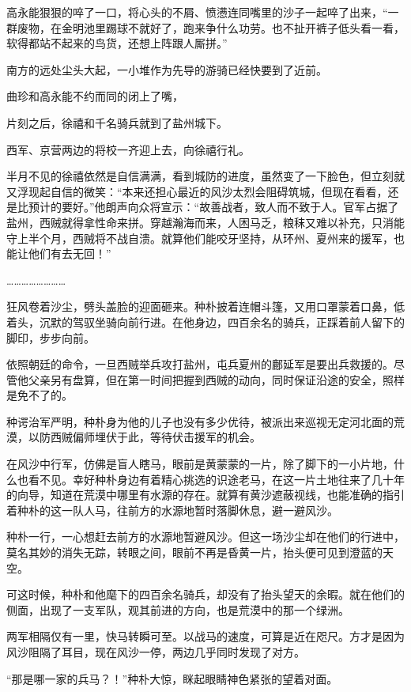高永能狠狠的啐了一口，将心头的不屑、愤懑连同嘴里的沙子一起啐了出来，“一群废物，在金明池里踢球不就好了，跑来争什么功劳。也不扯开裤子低头看一看，软得都站不起来的鸟货，还想上阵跟人厮拼。”

南方的远处尘头大起，一小堆作为先导的游骑已经快要到了近前。

曲珍和高永能不约而同的闭上了嘴，

片刻之后，徐禧和千名骑兵就到了盐州城下。

西军、京营两边的将校一齐迎上去，向徐禧行礼。

半月不见的徐禧依然是自信满满，看到城防的进度，虽然变了一下脸色，但立刻就又浮现起自信的微笑：“本来还担心最近的风沙太烈会阻碍筑城，但现在看看，还是比预计的要好。”他朗声向众将宣示：“故善战者，致人而不致于人。官军占据了盐州，西贼就得拿性命来拼。穿越瀚海而来，人困马乏，粮秣又难以补充，只消能守上半个月，西贼将不战自溃。就算他们能咬牙坚持，从环州、夏州来的援军，也能让他们有去无回！”

……………………

狂风卷着沙尘，劈头盖脸的迎面砸来。种朴披着连帽斗篷，又用口罩蒙着口鼻，低着头，沉默的驾驭坐骑向前行进。在他身边，四百余名的骑兵，正踩着前人留下的脚印，步步向前。

依照朝廷的命令，一旦西贼举兵攻打盐州，屯兵夏州的鄜延军是要出兵救援的。尽管他父亲另有盘算，但在第一时间把握到西贼的动向，同时保证沿途的安全，照样是免不了的。

种谔治军严明，种朴身为他的儿子也没有多少优待，被派出来巡视无定河北面的荒漠，以防西贼偏师埋伏于此，等待伏击援军的机会。

在风沙中行军，仿佛是盲人瞎马，眼前是黄蒙蒙的一片，除了脚下的一小片地，什么也看不见。幸好种朴身边有着精心挑选的识途老马，在这一片土地往来了几十年的向导，知道在荒漠中哪里有水源的存在。就算有黄沙遮蔽视线，也能准确的指引着种朴的这一队人马，往前方的水源地暂时落脚休息，避一避风沙。

种朴一行，一心想赶去前方的水源地暂避风沙。但这一场沙尘却在他们的行进中，莫名其妙的消失无踪，转眼之间，眼前不再是昏黄一片，抬头便可见到澄蓝的天空。

可这时候，种朴和他麾下的四百余名骑兵，却没有了抬头望天的余暇。就在他们的侧面，出现了一支军队，观其前进的方向，也是荒漠中的那一个绿洲。

两军相隔仅有一里，快马转瞬可至。以战马的速度，可算是近在咫尺。方才是因为风沙阻隔了耳目，现在风沙一停，两边几乎同时发现了对方。

“那是哪一家的兵马？！”种朴大惊，眯起眼睛神色紧张的望着对面。

